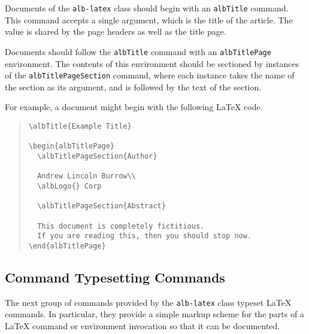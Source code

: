 \documentclass[11pt,a4paper,oneside,titlepage]{alb-latex}
\begin{document}
Documents of the \texttt{alb-latex} class should begin with an
\texttt{albTitle} command.  This command accepts a single argument,
which is the title of the article.  The value is shared by the page
headers as well as the title page.

Documents should follow the \texttt{albTitle} command with an
\texttt{albTitlePage} environment.  The contents of this environment
should be sectioned by instances of the \texttt{albTitlePageSection}
command, where each instance takes the name of the section as its
argument, and is followed by the text of the section.

For example, a document might begin with the following \LaTeX{} code.
\begin{quote}
\begin{verbatim}
\albTitle{Example Title}

\begin{albTitlePage}
  \albTitlePageSection{Author}

  Andrew Lincoln Burrow\\
  \albLogo{} Corp

  \albTitlePageSection{Abstract}

  This document is completely fictitious.
  If you are reading this, then you should stop now.
\end{albTitlePage}
\end{verbatim}
\end{quote}



\subsection{Command Typesetting Commands}
\label{sec:alb-latex:comm-types-comm}

The next group of commands provided by the \texttt{alb-latex} class
typeset \LaTeX{} commands.  In particular, they provide a simple markup
scheme for the parts of a \LaTeX{} command or environment invocation so
that it can be documented.
\end{document}
